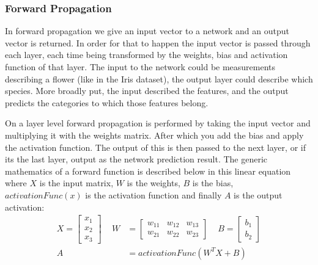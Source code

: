 \subsubsection{Forward Propagation}
In forward propagation we give an input vector to a network and an output vector
is returned. In order for that to happen the input vector is passed through each
layer, each time being transformed by the weights, bias and activation function
of that layer. The input to the network could be measurements describing a
flower (like in the Iris dataset), the output layer could describe which
species. More broadly put, the input described the features, and the output
predicts the categories to which those features belong.

On a layer level forward propagation is performed by taking the input vector and
multiplying it with the weights matrix. After which you add the bias and apply
the activation function. The output of this is then passed to the next layer, or
if its the last layer, output as the network prediction result. The generic
mathematics of a forward function is described below in this linear equation
where  \(X\) is the input matrix, \(W\) is the weights, \(B\) is the bias,
\(activationFunc(x)\) is the activation function and finally \(A\) is the output
activation:
\begin{equation}
    \begin{aligned}
        X = \begin{bmatrix}
            x_{1} \\
            x_{2} \\
            x_{3}
        \end{bmatrix} \, \, \, \, \, \, \,
        W &= \begin{bmatrix}
            w_{11} & w_{12} & w_{13} \\
            w_{21} & w_{22} & w_{23}
        \end{bmatrix} \, \, \, \, \, \, \,
        B = \begin{bmatrix}
            b_{1} \\
            b_{2}
        \end{bmatrix} \\[10pt]
        A &= activationFunc( W^{T}X + B )
    \end{aligned}
\end{equation}

